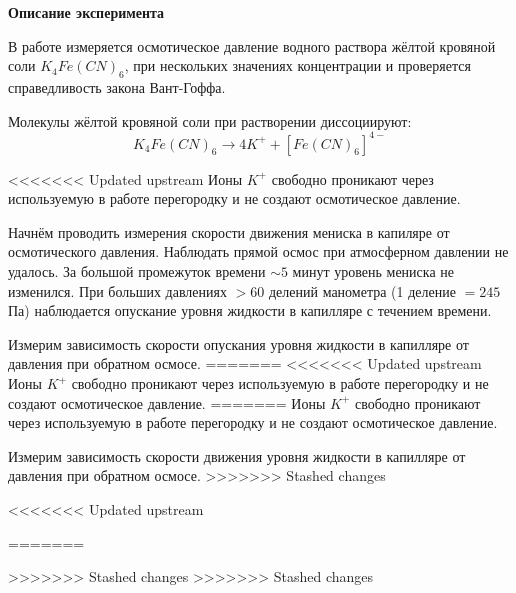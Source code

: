 \textbf{\Large Описание эксперимента}

В работе измеряется осмотическое давление водного раствора жёлтой кровяной соли $K_4 Fe (CN)_6$, при нескольких значениях концентрации и проверяется справедливость закона Вант-Гоффа.

Молекулы жёлтой кровяной соли при растворении диссоциируют:
$$
K_4 Fe (CN)_6 \rightarrow 4 K^+ + [Fe (CN)_6]^{4-}
$$

<<<<<<< Updated upstream
Ионы $K^+$ свободно проникают через используемую в работе перегородку и не создают осмотическое давление.

Начнём проводить измерения скорости движения мениска в капиляре от осмотического давления. Наблюдать прямой осмос при атмосферном давлении не удалось. За большой промежуток времени $\sim 5$ минут уровень мениска не изменился. При больших давлениях $>60$ делений манометра (1 деление $ = 245$ Па) наблюдается опускание уровня жидкости в капилляре с течением времени.

Измерим зависимость скорости опускания уровня жидкости в капилляре от давления при обратном осмосе.
=======
<<<<<<< Updated upstream
Ионы $K^+$ свободно проникают через используемую в работе перегородку и не создают осмотическое давление.
=======
Ионы $K^+$ свободно проникают через используемую в работе перегородку и не создают осмотическое давление.

Измерим зависимость скорости движения уровня жидкости в капилляре от давления при обратном осмосе.
>>>>>>> Stashed changes



\newpage

<<<<<<< Updated upstream

=======

>>>>>>> Stashed changes
>>>>>>> Stashed changes
